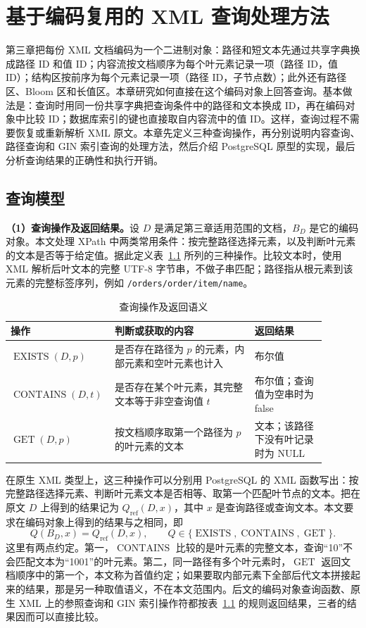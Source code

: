 \chapter{基于编码复用的 XML 查询处理方法}
\label{chap:query-reuse}

第三章把每份 XML 文档编码为一个二进制对象：路径和短文本先通过共享字典换成路径 ID 和值 ID；内容流按文档顺序为每个叶元素记录一项（路径 ID，值 ID）；结构区按前序为每个元素记录一项（路径 ID，子节点数）；此外还有路径区、Bloom 区和长值区。本章研究如何直接在这个编码对象上回答查询。基本做法是：查询时用同一份共享字典把查询条件中的路径和文本换成 ID，再在编码对象中比较 ID；数据库索引的键也直接取自内容流中的值 ID。这样，查询过程不需要恢复或重新解析 XML 原文。本章先定义三种查询操作，再分别说明内容查询、路径查询和 GIN 索引查询的处理方法，然后介绍 PostgreSQL 原型的实现，最后分析查询结果的正确性和执行开销。

\section{查询模型}
\textbf{（1）查询操作及返回结果。}设 $D$ 是满足第三章适用范围的文档，$B_D$ 是它的编码对象。本文处理 XPath 中两类常用条件：按完整路径选择元素，以及判断叶元素的文本是否等于给定值。据此定义表~\ref{tab:query-model} 所列的三种操作。比较文本时，使用 XML 解析后叶文本的完整 UTF-8 字节串，不做子串匹配；路径指从根元素到该元素的完整标签序列，例如 \texttt{/orders/order/item/name}。
\begin{table}[htbp]
\centering\small
\caption{查询操作及返回语义}
\label{tab:query-model}
\begin{tabular}{p{0.24\linewidth}p{0.43\linewidth}p{0.22\linewidth}}
\toprule
操作 & 判断或获取的内容 & 返回结果 \\
\midrule
$\operatorname{EXISTS}(D,p)$ & 是否存在路径为 $p$ 的元素，内部元素和空叶元素也计入 & 布尔值 \\
$\operatorname{CONTAINS}(D,t)$ & 是否存在某个叶元素，其完整文本等于非空查询值 $t$ & 布尔值；查询值为空串时为 false \\
$\operatorname{GET}(D,p)$ & 按文档顺序取第一个路径为 $p$ 的叶元素的文本 & 文本；该路径下没有叶记录时为 NULL \\
\bottomrule
\end{tabular}
\end{table}
在原生 XML 类型上，这三种操作可以分别用 PostgreSQL 的 XML 函数写出：按完整路径选择元素、判断叶元素文本是否相等、取第一个匹配叶节点的文本\cite{pg16xmlfunc}。把在原文 $D$ 上得到的结果记为 $Q_{\mathrm{ref}}(D,x)$，其中 $x$ 是查询路径或查询文本。本文要求在编码对象上得到的结果与之相同，即
\begin{equation}
Q(B_D,x)=Q_{\mathrm{ref}}(D,x),\qquad
Q\in\{\operatorname{EXISTS},\operatorname{CONTAINS},\operatorname{GET}\}.
\label{eq:query-equivalence}
\end{equation}
这里有两点约定。第一，$\operatorname{CONTAINS}$ 比较的是叶元素的完整文本，查询“10”不会匹配文本为“1001”的叶元素。第二，同一路径有多个叶元素时，$\operatorname{GET}$ 返回文档顺序中的第一个，本文称为首值约定；如果要取内部元素下全部后代文本拼接起来的结果，那是另一种取值语义，不在本文范围内。后文的编码对象查询函数、原生 XML 上的参照查询和 GIN 索引操作符都按表~\ref{tab:query-model} 的规则返回结果，三者的结果因而可以直接比较。

